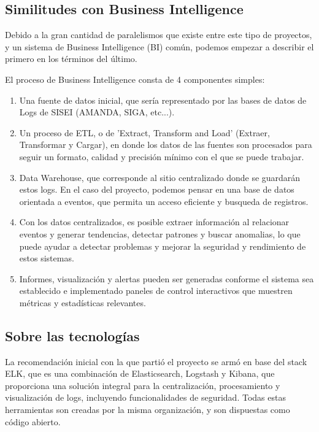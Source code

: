 
\subsection{Similitudes con Business Intelligence}

Debido a la gran cantidad de paralelismos que existe entre este tipo de proyectos, y un sistema de Business Intelligence (BI) común, podemos empezar a describir el primero en los términos del último.


El proceso de Business Intelligence consta de 4 componentes simples:

\begin{enumerate}
  \item Una fuente de datos inicial, que sería representado por las bases de datos de Logs de SISEI (AMANDA, SIGA, etc...).
  \item Un proceso de ETL, o de 'Extract, Transform and Load' (Extraer, Transformar y Cargar), en donde los datos de las fuentes son procesados para seguir un formato, calidad y precisión mínimo con el que se puede trabajar.
  \item Data Warehouse, que corresponde al sitio centralizado donde se guardarán estos logs. En el caso del proyecto, podemos pensar en una base de datos orientada a eventos, que permita un acceso eficiente y busqueda de registros.
  \item Con los datos centralizados, es posible extraer información al relacionar eventos y generar tendencias, detectar patrones y buscar anomalias, lo que puede ayudar a detectar problemas y mejorar la seguridad y rendimiento de estos sistemas.
  \item Informes, visualización y alertas pueden ser generadas conforme el sistema sea establecido e implementado paneles de control interactivos que muestren métricas y estadísticas relevantes.
\end{enumerate}

\subsection{Sobre las tecnologías}

La recomendación inicial con la que partió el proyecto se armó en base del stack ELK, que es una combinación de Elasticsearch, Logstash y Kibana, que proporciona una solución integral para la centralización, procesamiento y visualización de logs, incluyendo funcionalidades de seguridad. Todas estas herramientas son creadas por la misma organización, y son dispuestas como código abierto.


